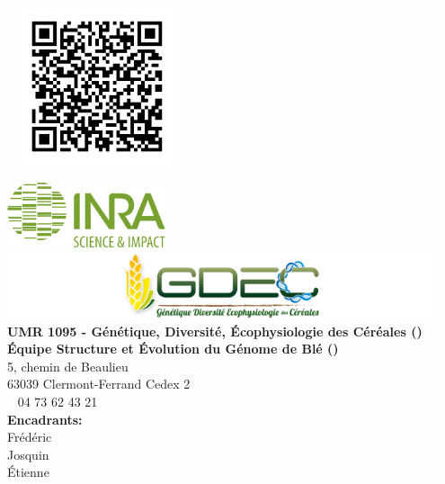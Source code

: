\documentclass[a4paper, 12pt]{article}
\begin{document}
\begin{onehalfspace}
\newpage
\thispagestyle{empty}
\begin{center}
~\vfill
\includegraphics[width=0.35\textwidth]{pic_Data/QRcode.png}\\
\vfill
\end{center}


\newpage
\thispagestyle{empty}
\begin{center}
  \includegraphics[width=0.35\textwidth]{pic_Data/inra.jpg}\\
\vspace{3cm}
\includegraphics[width=0.95\textwidth]{pic_Data/log_gdec.png}\\
\vspace{1.5cm}
	\large\textbf{UMR 1095 - Génétique, Diversité, Écophysiologie des Céréales ()\\
	Équipe Structure et Évolution du Génome de Blé ()}\\
	5, chemin de Beaulieu\\
	63039 Clermont-Ferrand Cedex 2\\
	\phone ~ 04 73 62 43 21\\
\vspace{3cm}
	\large\textbf{Encadrants:}\\
	Frédéric \\
	Josquin \\
	Étienne  \\
\end{center}



\end{onehalfspace}
\end{document}
